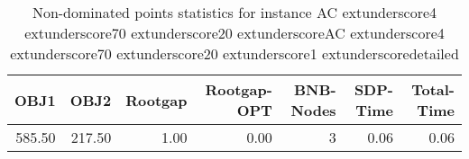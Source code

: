 \begin{table}
\caption{Non-dominated points statistics for instance AC	extunderscore4	extunderscore70	extunderscore20	extunderscoreAC	extunderscore4	extunderscore70	extunderscore20	extunderscore1	extunderscoredetailed}
\label{tab:stats/AC_4_70_20_AC_4_70_20_1_detailed}
\begin{tabular}{rrrrrrr}
\toprule
OBJ1 & OBJ2 & Rootgap & Rootgap-OPT & BNB-Nodes & SDP-Time & Total-Time \\
\midrule
585.50 & 217.50 & 1.00 & 0.00 & 3 & 0.06 & 0.06 \\
\bottomrule
\end{tabular}
\end{table}
